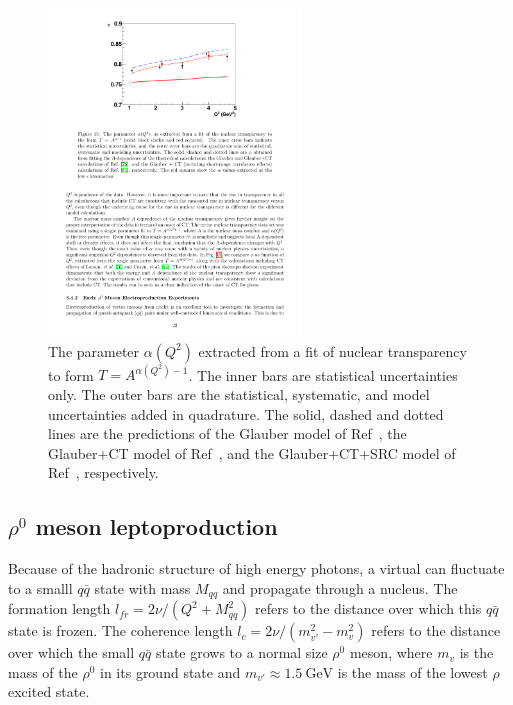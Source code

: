 \begin{figure}[!h]
    \centering
    \includegraphics[width=0.6\textwidth]{chap2/pion_electroproduction_transparency_A_dependence.pdf}
    \caption{
            The parameter $\alpha(Q^2)$ extracted from a fit of nuclear
            transparency to form $T=A^{\alpha(Q^2)-1}$.
            The inner bars are statistical uncertainties only.
            The outer bars are the statistical, systematic, and model
            uncertainties added in quadrature.
            The solid, dashed and dotted lines are the predictions of
            the Glauber model of Ref~\cite{Larson_2006},
            the Glauber+CT model of Ref~\cite{Larson_2006},
            and the Glauber+CT+SRC model of Ref~\cite{Cosyn_2006},
            respectively.
            }
    \label{fig:pion_electroproduction_transparency_A_dependence}
\end{figure}

\subsection{$\rho^0$ meson leptoproduction}
Because of the hadronic structure of high energy photons,
a virtual can fluctuate to a smalll $q\bar{q}$ state with mass $M_{qq}$ and
propagate through a nucleus.
The formation length $l_{fr}=2\nu/(Q^2+M^2_{qq})$ refers to the distance over
which this $q\bar{q}$ state is frozen.
The coherence length $l_c=2\nu/(m^2_{v'}-m^2_{v})$ refers to the distance over
which the small $q\bar{q}$ state grows to a normal size $\rho^0$ meson,
where $m_v$ is the mass of the $\rho^0$ in its ground state
and $m_{v'}\approx\SI{1.5}{\giga\electronvolt}$ is the mass of the lowest $\rho$
excited state.



